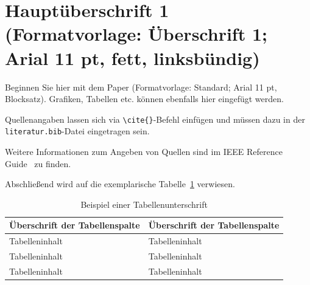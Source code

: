 \newcommand{\vortragstitel}{Titel (Formatvorlage: Titel; Arial 14 pt, fett, linksbündig)}

\newcommand{\referent}{Akad. Titel, Vorname, Nachname, Firma, Land des Referenten/der Referentin}

\newcommand{\coautoren}{Akad. Titel, Vorname, Nachname, Firma, Land des Co-Autors/der Co-Autorin\\
ggf. weitere Co-Autor*innen darunter mit den gleichen Angaben, jeweils in neuer Zeile\\
(Formatvorlage: Autor*innen; Arial 11 pt, linksbündig)}

\newcommand{\schluesselwoerter}{Modenverwirbelungskammer, Reverberation Chamber, Statistische Verteilung, Korrelation, Leitungstheorie, Störfestigkeitsuntersuchung, Elektromagnetische Verträglichkeit, Richtwirkung, Direktivität, Absorberhalle, Wellenleiter, Prüflingsmodell}



\section{Hauptüberschrift 1 (Formatvorlage: Überschrift 1; Arial 11 pt, fett, linksbündig)}

Beginnen Sie hier mit dem Paper (Formatvorlage: Standard; Arial 11 pt, Blocksatz). Grafiken, Tabellen etc. können ebenfalls hier eingefügt werden.

Quellenangaben lassen sich via \verb|\cite{}|-Befehl einfügen und müssen dazu in der \texttt{literatur.bib}-Datei eingetragen sein.

\nocite{quelle1,quelle2,quelle3,quelle4,quelle5}

Weitere Informationen zum Angeben von Quellen sind im IEEE Reference Guide~\cite{ieee:style_manual} zu finden.

Abschließend wird auf die exemplarische Tabelle~\ref{tab:beispiel} verwiesen.

\begin{table}
	\centering
		\begin{tabular}{@{}p{}p{}@{}}
			\toprule
			\bfseries Überschrift der Tabellenspalte & \bfseries Überschrift der Tabellenspalte \\
			\midrule
			Tabelleninhalt & Tabelleninhalt \\
			\midrule
			Tabelleninhalt & Tabelleninhalt \\
			\midrule
			Tabelleninhalt & Tabelleninhalt \\
			\bottomrule
	\end{tabular}
	\caption{Beispiel einer Tabellenunterschrift}
	\label{tab:beispiel}
\end{table}
 
